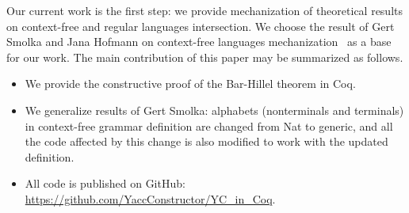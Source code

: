 Our current work is the first step: we provide mechanization of theoretical results on context-free and regular languages intersection.
We choose the result of Gert Smolka and Jana Hofmann on context-free languages mechanization~\cite{smolkaHofmann2016} as a base for our work.
The main contribution of this paper may be summarized as follows.
\begin{itemize}
\item We provide the constructive proof of the Bar-Hillel theorem in Coq.
\item We generalize results of Gert Smolka: alphabets (nonterminals and terminals) in context-free grammar definition are changed from Nat to generic, and all the code affected by this change is also modified to work with the updated definition.
\item All code is published on GitHub: \url{https://github.com/YaccConstructor/YC_in_Coq}.
\end{itemize}


